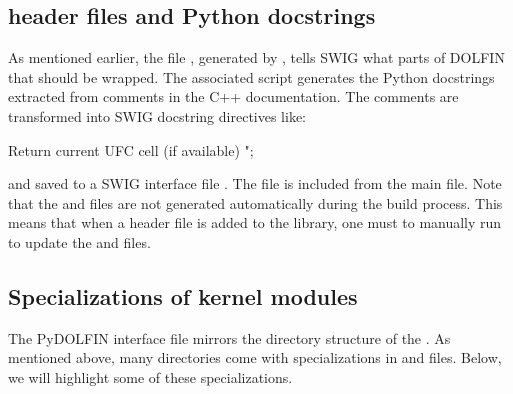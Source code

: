 \subsection{\dolfin header files and Python docstrings}
As mentioned earlier, the file , generated by  
, tells SWIG what parts of DOLFIN that should be wrapped. 
The associated script  generates the Python
docstrings extracted from comments in the C++ documentation.  
The comments are transformed into SWIG docstring directives like:
\begin{c++}
Return current UFC cell (if available)
";
\end{c++}
and saved to a SWIG interface file . The
 file is included from the main  file.
Note that the  and  files are not
generated automatically during the build process. This means that when a 
header file is added to the \dolfin library, one must to manually run
 to update the  and  files.


\subsection{Specializations of kernel modules}
The PyDOLFIN interface file  
mirrors the directory structure of the . 
As mentioned above, many directories come with specializations in
 and  files.  
Below, we will highlight some of these specializations. 

